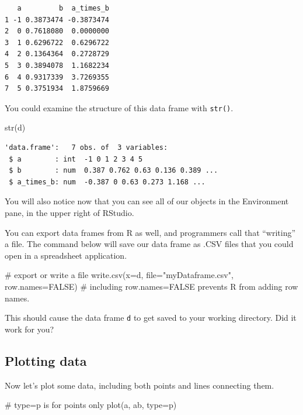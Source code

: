 \documentclass[
  letterpaper,
  DIV=11,
  numbers=noendperiod]{scrreprt}
\newenvironment{Shaded}{\begin{snugshade}}{\end{snugshade}}
\newcommand{\AttributeTok}[1]{\textcolor[rgb]{0.40,0.45,0.13}{#1}}
\newcommand{\CommentTok}[1]{\textcolor[rgb]{0.37,0.37,0.37}{#1}}
\newcommand{\ConstantTok}[1]{\textcolor[rgb]{0.56,0.35,0.01}{#1}}
\newcommand{\FunctionTok}[1]{\textcolor[rgb]{0.28,0.35,0.67}{#1}}
\newcommand{\NormalTok}[1]{\textcolor[rgb]{0.00,0.23,0.31}{#1}}
\newcommand{\StringTok}[1]{\textcolor[rgb]{0.13,0.47,0.30}{#1}}
\begin{document}
\begin{verbatim}
   a         b  a_times_b
1 -1 0.3873474 -0.3873474
2  0 0.7618080  0.0000000
3  1 0.6296722  0.6296722
4  2 0.1364364  0.2728729
5  3 0.3894078  1.1682234
6  4 0.9317339  3.7269355
7  5 0.3751934  1.8759669
\end{verbatim}

You could examine the structure of this data frame with \texttt{str()}.

\begin{Shaded}
\begin{Highlighting}[]
\FunctionTok{str}\NormalTok{(d)}
\end{Highlighting}
\end{Shaded}

\begin{verbatim}
'data.frame':   7 obs. of  3 variables:
 $ a        : int  -1 0 1 2 3 4 5
 $ b        : num  0.387 0.762 0.63 0.136 0.389 ...
 $ a_times_b: num  -0.387 0 0.63 0.273 1.168 ...
\end{verbatim}

You will also notice now that you can see all of our objects in the
Environment pane, in the upper right of RStudio.

You can export data frames from R as well, and programmers call that
``writing'' a file. The command below will save our data frame as .CSV
files that you could open in a spreadsheet application.

\begin{Shaded}
\begin{Highlighting}[]
\CommentTok{\# export or write a file}
\FunctionTok{write.csv}\NormalTok{(}\AttributeTok{x=}\NormalTok{d, }\AttributeTok{file=}\StringTok{"myDataframe.csv"}\NormalTok{, }\AttributeTok{row.names=}\ConstantTok{FALSE}\NormalTok{)}
\CommentTok{\# including row.names=FALSE prevents R from adding row names.}
\end{Highlighting}
\end{Shaded}

This should cause the data frame \texttt{d} to get saved to your working
directory. Did it work for you?

\subsection{Plotting data}\label{plotting-data}

Now let's plot some data, including both points and lines connecting
them.

\begin{Shaded}
\begin{Highlighting}[]
\CommentTok{\# type=\textquotesingle{}p\textquotesingle{} is for points only}
\FunctionTok{plot}\NormalTok{(a, ab, }\AttributeTok{type=}\StringTok{\textquotesingle{}p\textquotesingle{}}\NormalTok{) }
\end{Highlighting}
\end{Shaded}
\end{document}
